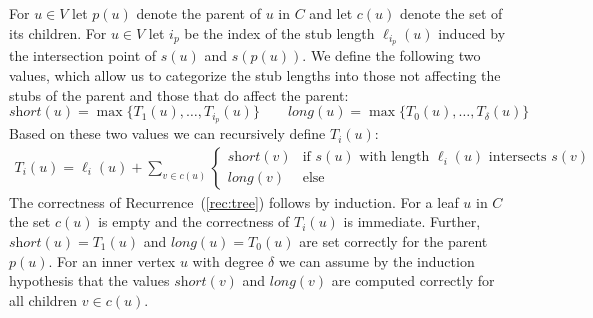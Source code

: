 \documentclass[a4paper,english,numberwithinsect]{eurocg18}
\newcommand{\sollong}{\ensuremath{\textit{long}}\xspace}
\newcommand{\solshort}{\ensuremath{\textit{short}}\xspace}
\begin{document}
For $ u \in V $ let $ p(u) $ denote the parent of $ u $ in $ C $ and let $ c(u) $ denote the set of its children. 
For $ u \in V $  %
let $ i_p $ be the index of the stub length $\ell_{i_p}(u)$ induced by the intersection point of $s(u)$ and $s(p(u))$.
We define the following two values, which allow us to categorize the stub lengths into those not affecting the stubs of the parent and those that do affect the parent:
\[	
	\solshort(u) = \max\{T_1(u),\dots,T_{i_p}(u)\} \qquad
	\sollong(u) = \max\{T_0(u),\dots,T_{\delta}(u)\}
\]
Based on these two values we can recursively define $ T_i(u) $: %
\begin{align}
	\label{rec:tree}
	T_i(u) = \ell_i(u) + \sum_{v \in c(u)}
	\begin{cases}
		\solshort(v) & \text{if } s(u) \text{ with length } \ell_i(u) \text{ intersects } s(v) \\
		\sollong(v) & \text{else}
	\end{cases}
\end{align}
The correctness of Recurrence~(\ref{rec:tree}) follows by induction. 
For a leaf $u$ in $C$ the set $c(u)$ is empty and the correctness of $T_i(u)$ is immediate.
Further, $\solshort(u) = T_1(u)$ and $\sollong(u) = T_0(u)$ are set correctly for the parent $p(u)$.
For an inner vertex $ u $ with degree $\delta$ we can assume by the induction hypothesis that the values $ \solshort(v) $ and $ \sollong(v) $ are computed correctly for all children $ v \in c(u) $. 
\end{document}
